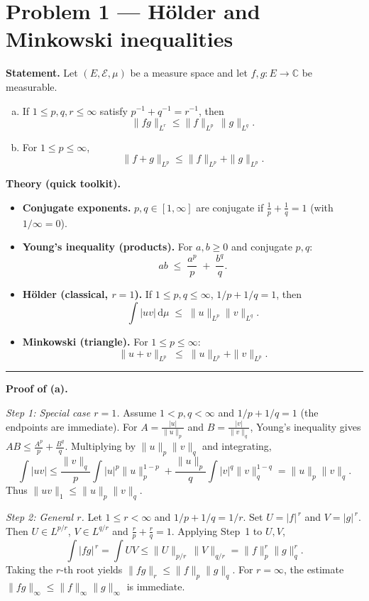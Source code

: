\documentclass[12pt,a4paper]{article}
\theoremstyle{plain}
\theoremstyle{definition}
\theoremstyle{remark}
\theoremstyle{remark}
\newcommand{\tighthrule}{\vspace{0.6\baselineskip}\hrule\vspace{0.8\baselineskip}}
\theoremstyle{definition}
\begin{document}
	
\section*{Problem 1 — Hölder and Minkowski inequalities}

\textbf{Statement.}
Let $(E,\mathcal E,\mu)$ be a measure space and let $f,g:E\to\mathbb C$ be measurable.

\begin{enumerate}[(a)]
	\item If $1\le p,q,r\le\infty$ satisfy $p^{-1}+q^{-1}=r^{-1}$, then
	\[
	\|fg\|_{L^r}\le \|f\|_{L^p}\,\|g\|_{L^q}.
	\]
	\item For $1\le p\le\infty$,
	\[
	\|f+g\|_{L^p}\le \|f\|_{L^p}+\|g\|_{L^p}.
	\]
\end{enumerate}
\textbf{Theory (quick toolkit).}

\begin{itemize}
	\item \textbf{Conjugate exponents.} \(p,q\in[1,\infty]\) are conjugate if \(\frac1p+\frac1q=1\) (with \(1/\infty=0\)).
	\item \textbf{Young’s inequality (products).} For \(a,b\ge0\) and conjugate \(p,q\):
	\[
	ab \;\le\; \frac{a^{p}}{p} \;+\; \frac{b^{q}}{q}.
	\]
	\item \textbf{Hölder (classical, \(r=1\)).} If \(1\le p,q\le\infty\), \(1/p+1/q=1\), then
	\[
	\int |uv| \,\mathrm d\mu \;\le\; \|u\|_{L^{p}}\|v\|_{L^{q}}.
	\]
	\item \textbf{Minkowski (triangle).} For \(1\le p\le\infty\):
	\[
	\|u+v\|_{L^{p}} \;\le\; \|u\|_{L^{p}} + \|v\|_{L^{p}}.
	\]
\end{itemize}

\tighthrule

\bigskip
\textbf{Proof of (a).}

\emph{Step 1: Special case $r=1$.}
Assume $1<p,q<\infty$ and $1/p+1/q=1$ (the endpoints are immediate).
For $A=\frac{|u|}{\|u\|_p}$ and $B=\frac{|v|}{\|v\|_q}$, Young’s inequality gives
$AB\le \frac{A^p}{p}+\frac{B^q}{q}$. Multiplying by $\|u\|_p\|v\|_q$ and integrating,
\[
\int |uv|
\le \frac{\|v\|_q}{p}\int |u|^p\|u\|_p^{1-p}
+ \frac{\|u\|_p}{q}\int |v|^q\|v\|_q^{1-q}
= \|u\|_p\|v\|_q.
\]
Thus $\|uv\|_1\le \|u\|_p\|v\|_q$.

\emph{Step 2: General $r$.}
Let $1\le r<\infty$ and $1/p+1/q=1/r$. Set $U=|f|^{\,r}$ and $V=|g|^{\,r}$.
Then $U\in L^{p/r}$, $V\in L^{q/r}$ and $\frac{r}{p}+\frac{r}{q}=1$. Applying Step~1 to $U,V$,
\[
\int |fg|^{\,r} = \int UV \le \|U\|_{p/r}\,\|V\|_{q/r}
= \|f\|_{p}^{r}\|g\|_{q}^{r}.
\]
Taking the $r$-th root yields $\|fg\|_{r}\le \|f\|_{p}\|g\|_{q}$.
For $r=\infty$, the estimate $\|fg\|_{\infty}\le \|f\|_{\infty}\|g\|_{\infty}$ is immediate.
\end{document}
